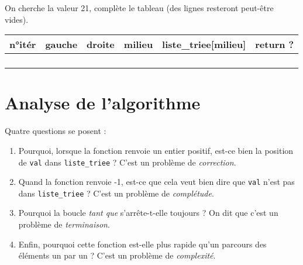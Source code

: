 \begin{exercice}
	On cherche la valeur 21, complète le tableau (des lignes resteront peut-être vides).
	\begin{center}
		\begin{tabular}{|c|c|c|c|c|c|}
			\hline
			{\ccell  n°itér} & {\ccell  gauche} & {\ccell  droite} & {\ccell  milieu} & {\ccell  liste\_triee[milieu]} & {\ccell  return ?} \\
			\hline
			                                                   &                               &                               &                               &                                             &                                 \\
			\hline
			                                                   &                               &                               &                               &                                             &                                 \\
			\hline
			                                                   &                               &                               &                               &                                             &                                 \\
			\hline
			                                                   &                               &                               &                               &                                             &                                 \\
			\hline
		\end{tabular}
	\end{center}
\end{exercice}
\section{Analyse de l'algorithme}

Quatre questions se posent :

\begin{enumerate}
	\item 	Pourquoi, lorsque la fonction renvoie un entier positif, est-ce bien la position de \texttt{val} dans \texttt{liste_triee} ?
	      C'est un problème de \textit{correction}.
	\item 	Quand la fonction renvoie -1, est-ce que cela veut bien dire que \texttt{val} n'est pas dans \texttt{liste_triee} ?
	      C'est un problème de \textit{complétude}.
	\item 	Pourquoi la boucle \textit{tant que} s'arrête-t-elle toujours ? On dit que c'est un problème de \textit{terminaison}.
	\item	Enfin, pourquoi cette fonction est-elle plus rapide qu'un parcours des éléments un par un ?
	      C'est un problème de \textit{complexité}.
\end{enumerate}

